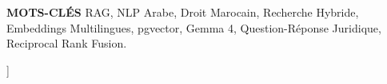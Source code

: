 {\vspace{1em}

\begin{leftbar}
\textbf{\textcolor{headingblue}{MOTS-CLÉS}} RAG, NLP Arabe, Droit Marocain,
Recherche Hybride, Embeddings Multilingues, pgvector, Gemma 4,
Question-Réponse Juridique, Reciprocal Rank Fusion.
\end{leftbar}

\vspace{2.5em}

}]